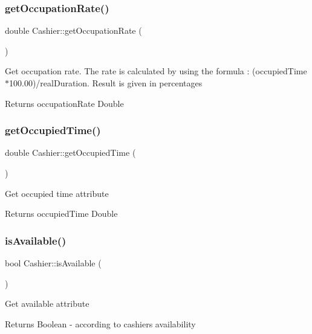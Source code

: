 \subsubsection{\texorpdfstring{get\+Occupation\+Rate()}{getOccupationRate()}}
{\footnotesize\ttfamily double Cashier\+::get\+Occupation\+Rate (\begin{DoxyParamCaption}{ }\end{DoxyParamCaption})}

Get occupation rate. The rate is calculated by using the formula \+: (occupied\+Time$\ast$100.00)/real\+Duration. Result is given in percentages \begin{DoxyReturn}{Returns}
occupation\+Rate Double 
\end{DoxyReturn}
\mbox{\label{classCashier_a1123f41f1643d9cce2e502243b2aa5b3}} 
\subsubsection{\texorpdfstring{get\+Occupied\+Time()}{getOccupiedTime()}}
{\footnotesize\ttfamily double Cashier\+::get\+Occupied\+Time (\begin{DoxyParamCaption}{ }\end{DoxyParamCaption})}

Get occupied time attribute \begin{DoxyReturn}{Returns}
occupied\+Time Double 
\end{DoxyReturn}
\mbox{\label{classCashier_a37d66e1a5f77c8f5cb8d77ef0b43e2e8}} 
\subsubsection{\texorpdfstring{is\+Available()}{isAvailable()}}
{\footnotesize\ttfamily bool Cashier\+::is\+Available (\begin{DoxyParamCaption}{ }\end{DoxyParamCaption})}

Get available attribute \begin{DoxyReturn}{Returns}
Boolean -\/ according to cashier\textquotesingle{}s availability 
\end{DoxyReturn}
\mbox{\label{classCashier_a98be1361808932fb8a2fa4c294dcf09a}} 
